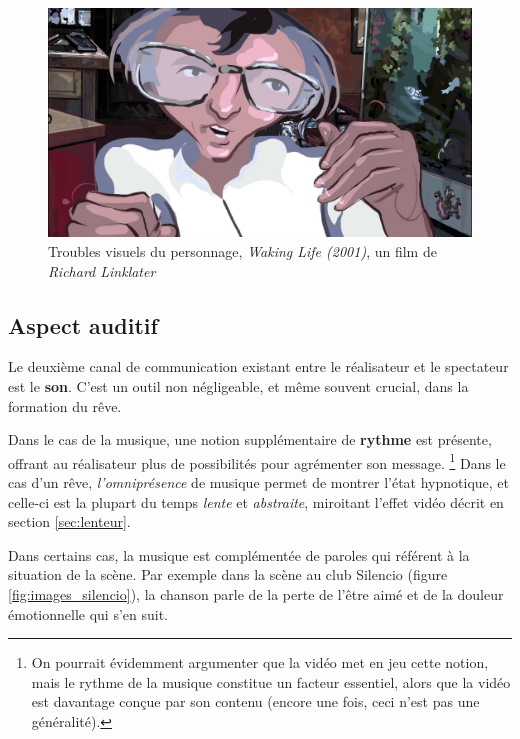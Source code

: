 \documentclass[../main.tex]{subfile}
\begin{document}
\begin{figure}
    \centering
    \includegraphics[width=\linewidth]{images/trouble2}
    \caption{Troubles visuels du personnage, \textit{Waking Life (2001)}, un
             film de \textit{Richard Linklater}}
    \label{fig:images_trouble2}
\end{figure}

\subsection{Aspect auditif}

Le deuxième canal de communication existant entre le réalisateur et le
spectateur est le \textbf{son}. C'est un outil non négligeable, et même souvent
crucial, dans la formation du rêve.

Dans le cas de la musique, une notion supplémentaire de \textbf{rythme} est
présente, offrant au réalisateur plus de possibilités pour agrémenter son
message. \footnote{On pourrait évidemment argumenter que la vidéo met en jeu
cette notion, mais le rythme de la musique constitue un facteur essentiel,
alors que la vidéo est davantage conçue par son contenu (encore une fois,
ceci n'est pas une généralité).} Dans le cas d'un rêve, \emph{l'omniprésence}
de musique permet de montrer l'état hypnotique, et celle-ci est la plupart du
temps \emph{lente} et \emph{abstraite}, miroitant l'effet vidéo décrit en
section \ref{sec:lenteur}.

Dans certains cas, la musique est complémentée de paroles qui référent à la
situation de la scène. Par exemple dans la scène au club Silencio (figure
\ref{fig:images_silencio}), la chanson parle de la perte de l'être aimé et de la
douleur émotionnelle qui s'en suit. %
\end{document}
